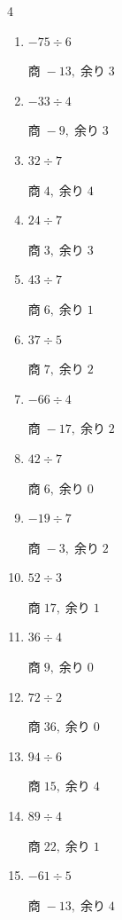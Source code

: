 \begin{multicols}{4}
\begin{enumerate}
        $商\; -1,\; 余り\; 0$

  \item $-75 \div 6$

        $商\; -13,\; 余り\; 3$

  \item $-33 \div 4$

        $商\; -9,\; 余り\; 3$

  \item $32 \div 7$

        $商\; 4,\; 余り\; 4$

  \item $24 \div 7$

        $商\; 3,\; 余り\; 3$

  \item $43 \div 7$

        $商\; 6,\; 余り\; 1$

  \item $37 \div 5$

        $商\; 7,\; 余り\; 2$

  \item $-66 \div 4$

        $商\; -17,\; 余り\; 2$

  \item $42 \div 7$

        $商\; 6,\; 余り\; 0$

  \item $-19 \div 7$

        $商\; -3,\; 余り\; 2$

  \item $52 \div 3$

        $商\; 17,\; 余り\; 1$

  \item $36 \div 4$

        $商\; 9,\; 余り\; 0$

  \item $72 \div 2$

        $商\; 36,\; 余り\; 0$

  \item $94 \div 6$

        $商\; 15,\; 余り\; 4$

  \item $89 \div 4$

        $商\; 22,\; 余り\; 1$

  \item $-61 \div 5$

        $商\; -13,\; 余り\; 4$


\end{enumerate}
\end{multicols}
